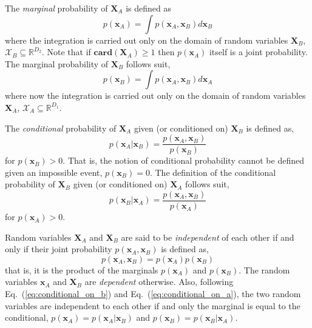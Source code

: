 The \emph{marginal} probability of $\mathbf{X}_A$ is defined as
\begin{equation}
  p(\mathbf{x}_A) = \int p(\mathbf{x}_A,\mathbf{x}_B) d\mathbf{x}_B
\label{eq:marginal_set_a}
\end{equation}
where the integration is carried out only on the domain of random variables $\mathbf{X}_B$, $\mathcal{X}_B \subseteq \mathbb{R}^{D_2}$. 
Note that if $\mathbf{card}(\mathbf{X}_A) \geq 1$ then $p(\mathbf{x}_A)$ itself is a joint probability.
The marginal probability of $\mathbf{X}_B$ follows suit,
\begin{equation}
  p(\mathbf{x}_B) = \int p(\mathbf{x}_A,\mathbf{x}_B) d\mathbf{x}_A
\label{eq:marginal_set_b}
\end{equation}
where now the integration is carried out only on the domain of random variables $\mathbf{X}_A$, $\mathcal{X}_A \subseteq \mathbb{R}^{D_1}$.

The \emph{conditional} probability of $\mathbf{X}_A$ given (or conditioned on) $\mathbf{X}_B$ is defined as,
\begin{equation}
  p(\mathbf{x}_A|\mathbf{x}_B) = \frac{p(\mathbf{x}_A, \mathbf{x}_B)}{p(\mathbf{x}_B)}
\label{eq:conditional_on_b}
\end{equation}
for $p(\mathbf{x}_B) > 0$. That is, the notion of conditional probability cannot be defined given an impossible event, $p(\mathbf{x}_B) = 0$. 
The definition of the conditional probability of $\mathbf{X}_B$ given (or conditioned on) $\mathbf{X}_A$ follows suit, 
\begin{equation}
  p(\mathbf{x}_B|\mathbf{x}_A) = \frac{p(\mathbf{x}_A, \mathbf{x}_B)}{p(\mathbf{x}_A)}
\label{eq:conditional_on_a}
\end{equation}
for $p(\mathbf{x}_A) > 0$.

Random variables $\mathbf{X}_A$ and $\mathbf{X}_B$ are said to be \emph{independent} of each
other if and only if their joint probability $p(\mathbf{x}_A, \mathbf{x}_B)$ is defined as,
\begin{equation}
  p(\mathbf{x}_A, \mathbf{x}_B) = p(\mathbf{x}_A) p(\mathbf{x}_B)
\label{eq:independence}
\end{equation}
that is, it is the product of the marginals $p(\mathbf{x}_A)$ and $p(\mathbf{x}_B)$.
The random variables $\mathbf{x}_A$ and $\mathbf{X}_B$ are \emph{dependent} otherwise.
Also, following Eq.~(\ref{eq:conditional_on_b}) and Eq.~(\ref{eq:conditional_on_a}), the two random variables are independent to each other if and only the marginal is equal to the conditional, $p(\mathbf{x}_A) = p(\mathbf{x}_A|\mathbf{x}_B)$ and $p(\mathbf{x}_B) = p(\mathbf{x}_B|\mathbf{x}_A)$.


